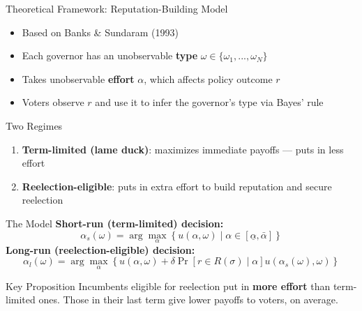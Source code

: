 \documentclass{beamer}
\begin{document}
\begin{frame}{Theoretical Framework: Reputation-Building Model}
\begin{itemize}
    \item Based on Banks \& Sundaram (1993)
    \vspace{0.5em}
    \item Each governor has an unobservable \textbf{type} $\omega \in \{\omega_1, ..., \omega_N\}$
    \vspace{0.5em}
    \item Takes unobservable \textbf{effort} $\alpha$, which affects policy outcome $r$
    \vspace{0.5em}
    \item Voters observe $r$ and use it to infer the governor's type via Bayes' rule
\end{itemize}
\vspace{0.5em}
\begin{block}{Two Regimes}
\begin{enumerate}
    \item \textbf{Term-limited (lame duck)}: maximizes immediate payoffs --- puts in less effort
    \item \textbf{Reelection-eligible}: puts in extra effort to build reputation and secure reelection
\end{enumerate}
\end{block}
\end{frame}

\begin{frame}{The Model}
\textbf{Short-run (term-limited) decision:}
\begin{equation*}
    \alpha_s(\omega) = \arg\max_{\alpha} \left\{ u(\alpha, \omega) \; | \; \alpha \in [\underline{\alpha}, \bar{\alpha}] \right\}
\end{equation*}
\vspace{0.5em}
\textbf{Long-run (reelection-eligible) decision:}
\begin{equation*}
    \alpha_l(\omega) = \arg\max_{\alpha} \left\{ u(\alpha, \omega) + \delta \Pr\left[r \in R(\sigma) \; | \; \alpha\right] u(\alpha_s(\omega), \omega) \right\}
\end{equation*}
\vspace{0.5em}
\begin{block}{Key Proposition}
Incumbents eligible for reelection put in \textbf{more effort} than term-limited ones. Those in their last term give lower payoffs to voters, on average.
\end{block}
\end{frame}
\end{document}
